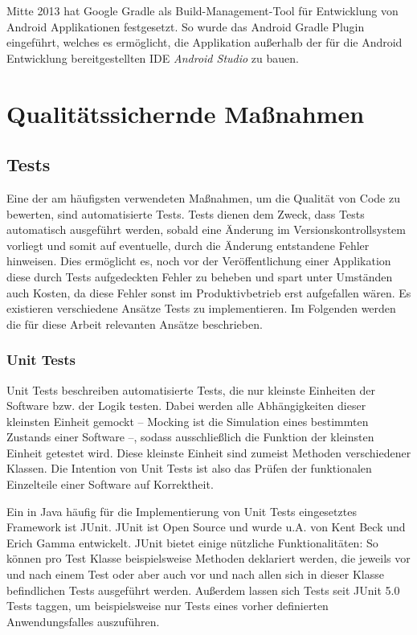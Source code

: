 			Mitte 2013 hat Google Gradle als Build-Management-Tool für Entwicklung von Android Applikationen festgesetzt. So wurde das Android Gradle Plugin eingeführt, welches es ermöglicht, die Applikation außerhalb der für die Android Entwicklung bereitgestellten \acs{IDE} \textit{Android Studio} zu bauen. \cite{Google.2282020}
		
	\section{Qualitätssichernde Maßnahmen} %
	
		\subsection{Tests} %
		\label{qm.tests}
		
			Eine der am häufigsten verwendeten Maßnahmen, um die Qualität von Code zu bewerten, sind automatisierte Tests. Tests dienen dem Zweck, dass Tests automatisch ausgeführt werden, sobald eine Änderung im Versionskontrollsystem vorliegt und somit auf eventuelle, durch die Änderung entstandene Fehler hinweisen. Dies ermöglicht es, noch vor der Veröffentlichung einer Applikation diese durch Tests aufgedeckten Fehler zu beheben und spart unter Umständen auch Kosten, da diese Fehler sonst im Produktivbetrieb erst aufgefallen wären. \cite{Huizinga.2007} Es existieren verschiedene Ansätze Tests zu implementieren. Im Folgenden werden die für diese Arbeit relevanten Ansätze beschrieben. 
			
			\subsubsection{Unit Tests}
			
				Unit Tests beschreiben automatisierte Tests, die nur kleinste Einheiten der Software bzw. der Logik testen. Dabei werden alle Abhängigkeiten dieser kleinsten Einheit gemockt -- Mocking ist die Simulation eines bestimmten Zustands einer Software --, sodass ausschließlich die Funktion der kleinsten Einheit getestet wird. Diese kleinste Einheit sind zumeist Methoden verschiedener Klassen. Die Intention von Unit Tests ist also das Prüfen der funktionalen Einzelteile einer Software auf Korrektheit. 
			
				Ein in Java häufig für die Implementierung von Unit Tests eingesetztes Framework ist JUnit. JUnit ist Open Source und wurde u.A. von Kent Beck und Erich Gamma entwickelt. JUnit bietet einige nützliche Funktionalitäten: So können pro Test Klasse beispielsweise Methoden deklariert werden, die jeweils vor und nach einem Test oder aber auch vor und nach allen sich in dieser Klasse befindlichen Tests ausgeführt werden. Außerdem lassen sich Tests seit JUnit 5.0 Tests taggen, um beispielsweise nur Tests eines vorher definierten Anwendungsfalles auszuführen. \cite{JUnitTeam.312020}
				

